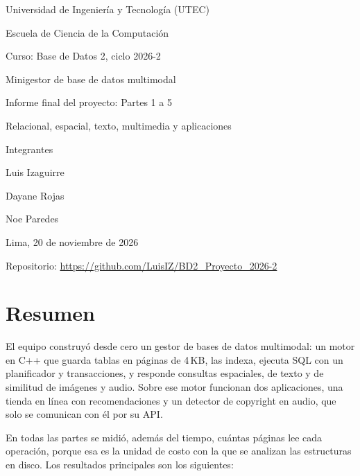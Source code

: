 \documentclass[11pt,a4paper]{article}
\begin{document}
\begin{titlepage}
  \centering
  {\large Universidad de Ingeniería y Tecnología (UTEC)\par}
  {\large Escuela de Ciencia de la Computación\par}
  \vspace{0.5cm}
  {\large Curso: Base de Datos 2, ciclo 2026-2\par}
  \vspace{3cm}
  {\LARGE Minigestor de base de datos multimodal\par}
  \vspace{0.5cm}
  {\Large Informe final del proyecto: Partes 1 a 5\par}
  \vspace{0.3cm}
  {\large Relacional, espacial, texto, multimedia y aplicaciones\par}
  \vspace{3cm}
  {\large Integrantes\par}
  \vspace{0.3cm}
  Luis Izaguirre\par
  Dayane Rojas\par
  Noe Paredes\par
  \vfill
  {\large Lima, 20 de noviembre de 2026\par}
  \vspace{0.3cm}
  Repositorio: \url{https://github.com/LuisIZ/BD2_Proyecto_2026-2}\par
\end{titlepage}

\section*{Resumen}

El equipo construyó desde cero un gestor de bases de datos multimodal: un motor en C++ que guarda tablas en páginas de 4\,KB, las indexa, ejecuta SQL con un planificador y transacciones, y responde consultas espaciales, de texto y de similitud de imágenes y audio. Sobre ese motor funcionan dos aplicaciones, una tienda en línea con recomendaciones y un detector de copyright en audio, que solo se comunican con él por su API.

En todas las partes se midió, además del tiempo, cuántas páginas lee cada operación, porque esa es la unidad de costo con la que se analizan las estructuras en disco. Los resultados principales son los siguientes:
\end{document}
